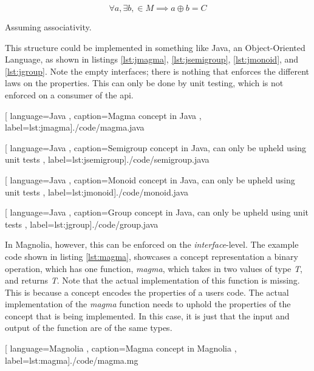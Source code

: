 \begin{equation}
  \forall a, \exists b, \in M \implies a \oplus b = C
\end{equation}

Assuming associativity.

This structure could be implemented in something like Java, an Object-Oriented
Language, as shown in listings \ref{lst:jmagma}, \ref{lst:jsemigroup},
\ref{lst:jmonoid}, and \ref{lst:jgroup}. Note the empty interfaces; there is
nothing that enforces the different laws on the properties. This can only be
done by unit testing, which is not enforced on a consumer of the \gls{api}.

\begin{center}
  
    [ language=Java
    , caption={Magma concept in Java}
    , label=lst:jmagma]{./code/magma.java}
\end{center}

\begin{center}
  
    [ language=Java
    , caption={Semigroup concept in Java, can only be upheld using unit tests}
    , label=lst:jsemigroup]{./code/semigroup.java}
\end{center}

\begin{center}
  
    [ language=Java
    , caption={Monoid concept in Java, can only be upheld using unit tests}
    , label=lst:jmonoid]{./code/monoid.java}
\end{center}

\begin{center}
  
    [ language=Java
    , caption={Group concept in Java, can only be upheld using unit tests}
    , label=lst:jgroup]{./code/group.java}
\end{center}

In Magnolia, however, this can be enforced on the \textit{interface}-level. The
example code shown in listing \ref{lst:magma}, showcases a concept
representation a binary operation, which has one function, \textit{magma}, which
takes in two values of type \textit{T}, and returns \textit{T}. Note that the
actual implementation of this function is missing. This is because a concept
encodes the properties of a users code. The actual implementation of the
\textit{magma} function needs to uphold the properties of the concept that is
being implemented. In this case, it is just that the input and output
of the function are of the same types.

\begin{center}
  
    [ language=Magnolia
    , caption={Magma concept in Magnolia}
    , label=lst:magma]{./code/magma.mg}
\end{center}

